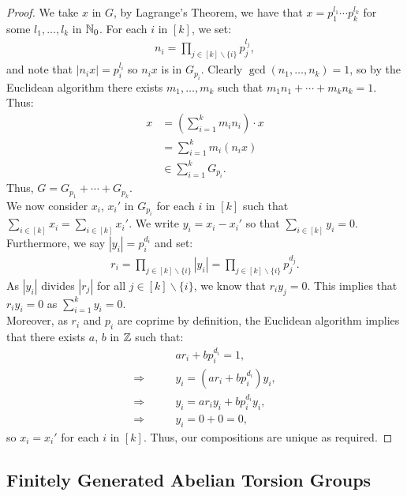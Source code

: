 \begin{proof}
    We take $x$ in $G$, by Lagrange's Theorem, we have that
    $x = p_1^{l_1} \cdots p_k^{l_k}$ for some $l_1, \ldots, l_k$ in $\mathbb{N}_0$.
    For each $i$ in $[k]$, we set: \begin{align*}
        n_i = \prod_{j \in [k]\backslash\{i\}} p_j^{l_j},
    \end{align*} and note that $|n_ix| = p_i^{l_i}$ so $n_ix$ is in $G_{p_i}$.
    Clearly $\gcd(n_1, \ldots, n_k) = 1$, so by the Euclidean algorithm there
    exists $m_1, \ldots, m_k$ such that $m_1n_1 + \cdots + m_kn_k = 1$. Thus:
    \begin{align*}
        x 
        &= \left(\sum_{i = 1}^k m_in_i\right) \cdot x \\
        &= \sum_{i = 1}^k m_i(n_ix) \\
        &\in \sum_{i = 1}^k G_{p_i}. 
    \end{align*} Thus, $G = G_{p_1} + \cdots + G_{p_k}$.
    \\[\baselineskip]
    We now consider $x_i$, $x_i'$ in $G_{p_i}$ for each $i$ in $[k]$ such
    that $\sum_{i \in [k]} x_i = \sum_{i \in [k]} x_i'$. We write
    $y_i = x_i - x_i'$ so that $\sum_{i \in [k]} y_i = 0$. Furthermore,
    we say $|y_i| = p_i^{d_i}$ and set: \begin{align*}
        r_i 
        = \prod_{j \in [k] \backslash \{i\}} |y_i|
        = \prod_{j \in [k] \backslash \{i\}} p_j^{d_j}.
    \end{align*} As $|y_i|$ divides $|r_j|$ for all 
    $j \in [k] \backslash \{i\}$, we know that $r_iy_j = 0$.
    This implies that $r_iy_i = 0$ as $\sum_{i = 1}^k y_i = 0$.
    \\[\baselineskip]
    Moreover, as $r_i$ and $p_i$ are coprime by definition, the
    Euclidean algorithm implies that there exists $a$, $b$ in $\mathbb{Z}$
    such that: \begin{align*}
        &ar_i + bp_i^{d_i} = 1, \\
        \Longrightarrow \qquad & y_i = (ar_i + bp_i^{d_i})y_i,  \\
        \Longrightarrow \qquad & y_i = ar_iy_i + bp_i^{d_i}y_i,  \\
        \Longrightarrow \qquad & y_i = 0 + 0 = 0, 
    \end{align*} so $x_i = x_i'$ for each $i$ in $[k]$. Thus, our
    compositions are unique as required.
\end{proof}

\subsection{Finitely Generated Abelian Torsion Groups}

